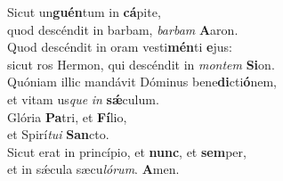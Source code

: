\evenverse Sicut un\textbf{guén}tum in \textbf{cá}pite,~\*\\
\evenverse quod descéndit in barbam, \textit{bar}\textit{bam} \textbf{A}aron.\\
\oddverse Quod descéndit in oram vesti\textbf{mén}ti \textbf{e}jus:~\*\\
\oddverse sicut ros Hermon, qui descéndit in \textit{mon}\textit{tem} \textbf{Si}on.\\
\evenverse Quóniam illic mandávit Dóminus bene\textbf{di}cti\textbf{ó}nem,~\*\\
\evenverse et vitam us\textit{que} \textit{in} \textbf{sǽ}culum.\\
\oddverse Glória \textbf{Pa}tri, et \textbf{Fí}lio,~\*\\
\oddverse et Spirí\textit{tu}\textit{i} \textbf{San}cto.\\
\evenverse Sicut erat in princípio, et \textbf{nunc}, et \textbf{sem}per,~\*\\
\evenverse et in sǽcula sæcu\textit{ló}\textit{rum}. \textbf{A}men.\\
